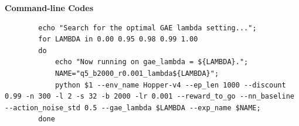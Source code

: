 \documentclass[10pt, letterpaper]{article}
\begin{document}
    \textbf{Command-line Codes}
    \begin{lstlisting}
        echo "Search for the optimal GAE lambda setting...";
        for LAMBDA in 0.00 0.95 0.98 0.99 1.00
        do
            echo "Now running on gae_lambda = ${LAMBDA}.";
            NAME="q5_b2000_r0.001_lambda${LAMBDA}";
            python $1 --env_name Hopper-v4 --ep_len 1000 --discount 0.99 -n 300 -l 2 -s 32 -b 2000 -lr 0.001 --reward_to_go --nn_baseline --action_noise_std 0.5 --gae_lambda $LAMBDA --exp_name $NAME;
        done
    \end{lstlisting}
    
\end{document}

